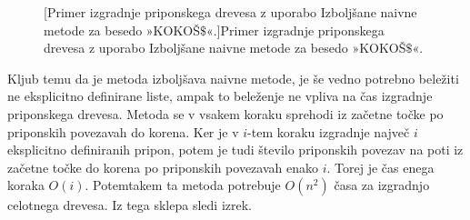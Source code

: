 \begin{figure}[htb]
\begin{subfigure}[t]{0.3\linewidth}
        
        \centering
        \label{fig:IzbolšanaNaivna1}
    \end{subfigure}
    \hspace{0.5cm}
    \begin{subfigure}[t]{0.3\linewidth}
        
        \centering
        \label{fig:IzbolšanaNaivna2}
    \end{subfigure}
    \hspace{0.5cm}
    \begin{subfigure}[t]{0.3\linewidth}
        
        \centering
        \label{fig:IzbolšanaNaivna3}
    \end{subfigure}
    \par\bigskip 
    \begin{subfigure}[t]{0.3\linewidth}
        
        \centering
        \label{fig:IzbolšanaNaivna4}
    \end{subfigure}
    \hspace{0.5cm}
    \begin{subfigure}[t]{0.3\linewidth}
        
        \centering
        \label{fig:IzbolšanaNaivna5}
    \end{subfigure}
    \hspace{0.5cm}
    \begin{subfigure}[t]{0.3\textwidth}
        
        \centering
        \label{fig:IzbolšanaNaivna6}
    \end{subfigure}

       [Primer izgradnje priponskega drevesa z uporabo Izboljšane naivne metode za besedo »KOKOŠ$\$$«.]{Primer izgradnje priponskega drevesa z uporabo Izboljšane naivne metode za besedo »KOKOŠ$\$$«.} 
        \label{fig:IzbolšanaNaivna}
\end{figure}

Kljub temu da je metoda izboljšava naivne metode, je še vedno potrebno beležiti ne eksplicitno definirane liste, ampak to beleženje ne vpliva na čas izgradnje priponskega drevesa. Metoda se v vsakem koraku sprehodi iz začetne točke po priponskih povezavah do korena. Ker je v $i$-tem koraku izgradnje največ $i$ eksplicitno definiranih pripon, potem je tudi število priponskih povezav na poti iz začetne točke do korena po priponskih povezavah enako $i$. Torej je čas enega koraka $O(i)$. Potemtakem ta metoda potrebuje $O(n^2)$ časa za izgradnjo celotnega drevesa. Iz tega sklepa sledi izrek.


